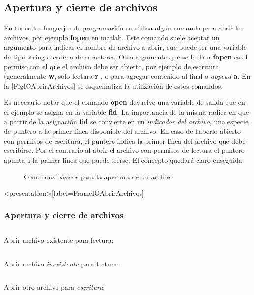 \subsection{Apertura y cierre de archivos}
En todos los lenguajes de programación se utiliza algún comando
para abrir los archivos, por ejemplo \textbf{fopen} en matlab.
Este comando suele aceptar un argumento para indicar el
nombre de archivo a abrir, que puede ser una variable 
de tipo string o cadena de caracteres. Otro argumento
que se le da a \textbf{fopen} es el permiso con el 
que el archivo debe ser abierto, por ejemplo
de escritura (generalmente \textbf{w}, solo lectura \textbf{r}
, o para agregar contenido al final o \emph{append} \textbf{a}. 
En la  \autoref{FigIOAbrirArchivos} se esquematiza
la utilización de estos comandos. 

Es necesario notar que el comando \textbf{open} devuelve
una variable de salida que en el ejemplo se asigna 
en la variable \textbf{fid}. 
La importancia de la misma radica en que a partir
de la asignación \textbf{fid} se convierte en 
un \emph{indicador del archivo}, una especie de puntero
a la primer línea disponible del archivo. En caso
de haberlo abierto con permisos de escritura, 
el puntero indica la primer línea del 
archivo que debe escribirse. Por el contrario
al abrir el archivo con permisos de lectura
el puntero apunta a la primer
línea que puede leerse. El concepto quedará 
claro enseguida. 

\begin{figure}
\caption{Comandos básicos para la apertura de un archivo\label{FigIOAbrirArchivos}}
\end{figure}

\mode*

\begin{frame}<presentation>[label=FrameIOAbrirArchivos]
\frametitle{Apertura y cierre de archivos}

\begin{columns}[T]
\hfill Abrir archivo existente para lectura:

\end{columns}

\begin{columns}[T]
\hfill Abrir archivo \emph{inexistente} para lectura:

\end{columns}

\begin{columns}[T]
\hfill Abrir otro archivo  para \emph{escritura}:

\end{columns}

\end{frame}


